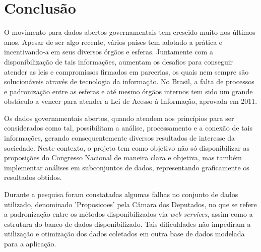 \documentclass[
	12pt,				%
	openright,			%
	twoside,			%
	a4paper,			%
	english,			%
	french,				%
	spanish,			%
	brazil				%
	]{abntex2}
\begin{document}
{%
\chapter{Conclusão}

O movimento para dados abertos governamentais tem crescido muito nos últimos anos. Apesar de ser algo recente, vários países
tem adotado a prática e incentivando-a em seus diversos órgãos e esferas. Juntamente com a disponibilização de tais informações,
aumentam os desafios para conseguir atender as leis e compromissos firmados em parcerias, os quais nem sempre são solucionáveis
através de tecnologia da informação. No Brasil, a falta de processos e padronização entre as esferas e até mesmo órgãos internos
tem sido um grande obstáculo a vencer para atender a Lei de Acesso à Informação, aprovada em 2011.

Os dados governamentais abertos, quando atendem aos princípios para ser considerados como tal, possibilitam a análise, 
processamento e a conexão de tais informações, gerando consequentemente diversos resultados de interesse da sociedade. 
Neste contexto, o projeto tem como objetivo não só disponibilizar as proposições do Congresso Nacional de maneira clara e 
objetiva, mas também implementar análises em subconjuntos de dados, representando graficamente os resultados obtidos.

Durante a pesquisa foram constatadas algumas falhas no conjunto de dados utilizado, denominado 'Proposicoes' pela 
Câmara dos Deputados, no que se refere a padronização entre os métodos disponibilizados via \emph{web services}, assim
como a estrutura do banco de dados disponibilizado. Tais dificuldades não impediram a utilização e otimização dos dados
coletados em outra base de dados modelada para a aplicação.





%
%

}
\end{document}
